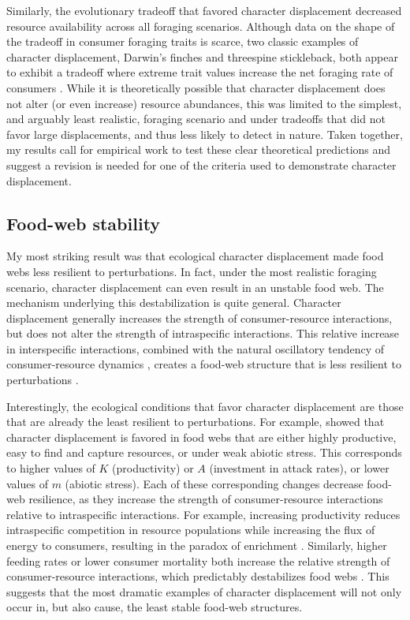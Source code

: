 \documentclass[11pt,]{article}
\begin{document}
Similarly, the evolutionary tradeoff that favored character displacement
decreased resource availability across all foraging scenarios. Although
data on the shape of the tradeoff in consumer foraging traits is scarce,
two classic examples of character displacement, Darwin's finches and
threespine stickleback, both appear to exhibit a tradeoff where extreme
trait values increase the net foraging rate of consumers
\citep{Schluter1985, Arnegard2014}. While it is theoretically possible
that character displacement does not alter (or even increase) resource
abundances, this was limited to the simplest, and arguably least
realistic, foraging scenario and under tradeoffs that did not favor
large displacements, and thus less likely to detect in nature. Taken
together, my results call for empirical work to test these clear
theoretical predictions and suggest a revision is needed for one of the
criteria used to demonstrate character displacement.

\subsection{Food-web stability}\label{food-web-stability}

My most striking result was that ecological character displacement made
food webs less resilient to perturbations. In fact, under the most
realistic foraging scenario, character displacement can even result in
an unstable food web. The mechanism underlying this destabilization is
quite general. Character displacement generally increases the strength
of consumer-resource interactions, but does not alter the strength of
intraspecific interactions. This relative increase in interspecific
interactions, combined with the natural oscillatory tendency of
consumer-resource dynamics \citep{Lotka1925, Volterra1926}, creates a
food-web structure that is less resilient to perturbations
\citep{Chesson2008, Rip2011, McCann2011}.

Interestingly, the ecological conditions that favor character
displacement are those that are already the least resilient to
perturbations. For example, \citet{McPeek2019} showed that character
displacement is favored in food webs that are either highly productive,
easy to find and capture resources, or under weak abiotic stress. This
corresponds to higher values of \(K\) (productivity) or \(A\)
(investment in attack rates), or lower values of \(m\) (abiotic stress).
Each of these corresponding changes decrease food-web resilience, as
they increase the strength of consumer-resource interactions relative to
intraspecific interactions. For example, increasing productivity reduces
intraspecific competition in resource populations while increasing the
flux of energy to consumers, resulting in the paradox of enrichment
\citep{Rosenzweig1971}. Similarly, higher feeding rates or lower
consumer mortality both increase the relative strength of
consumer-resource interactions, which predictably destabilizes food webs
\citep{Rip2011, McCann2011}. This suggests that the most dramatic
examples of character displacement will not only occur in, but also
cause, the least stable food-web structures.
\end{document}
